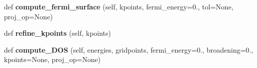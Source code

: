 \begin{DoxyCompactItemize}
\item 
def {\bfseries compute\+\_\+fermi\+\_\+surface} (self, kpoints, fermi\+\_\+energy=0., tol=None, proj\+\_\+op=None)\hypertarget{classwannier__tools_1_1wannier__system_ad48d42d6bcce91039211596875f092a7}{}\label{classwannier__tools_1_1wannier__system_ad48d42d6bcce91039211596875f092a7}

\item 
def {\bfseries refine\+\_\+kpoints} (self, kpoints)\hypertarget{classwannier__tools_1_1wannier__system_a774d5a49d1ad4d7e7f4932312a6605fc}{}\label{classwannier__tools_1_1wannier__system_a774d5a49d1ad4d7e7f4932312a6605fc}

\item 
def {\bfseries compute\+\_\+\+D\+OS} (self, energies, gridpoints, fermi\+\_\+energy=0., broadening=0., kpoints=None, proj\+\_\+op=None)\hypertarget{classwannier__tools_1_1wannier__system_a3df841935dde3452689cea1c3f26724a}{}\label{classwannier__tools_1_1wannier__system_a3df841935dde3452689cea1c3f26724a}

\end{DoxyCompactItemize}
